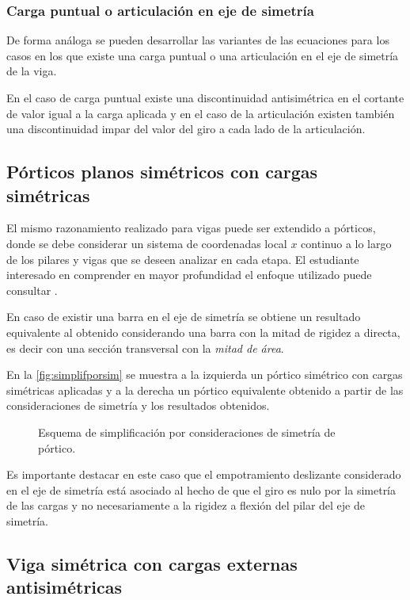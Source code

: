\subsubsection{Carga puntual o articulación en eje de simetría}

De forma análoga se pueden desarrollar las variantes de las ecuaciones para los casos en los que existe una carga puntual o una articulación en el eje de simetría de la viga.

En el caso de carga puntual existe una discontinuidad antisimétrica en el cortante de valor igual a la carga aplicada y en el caso de la articulación existen también una discontinuidad impar del valor del giro a cada lado de la articulación. %
%


\subsection{Pórticos planos simétricos con cargas simétricas}

El mismo razonamiento realizado para vigas puede ser extendido a pórticos, donde se debe considerar un sistema de coordenadas local $x$ continuo a lo largo de los pilares y vigas que se deseen analizar en cada etapa. %
%
El estudiante interesado en comprender en mayor profundidad el enfoque utilizado puede consultar \citep{CerveraRuiz2002ii}. %

En caso de existir una barra en el eje de simetría se obtiene un resultado equivalente al obtenido considerando una barra con la mitad de rigidez a directa, es decir con una sección transversal con la \textit{mitad de área}. %
%



En la \autoref{fig:simplifporsim} se muestra a la izquierda un pórtico simétrico con cargas simétricas aplicadas y a la derecha un pórtico equivalente obtenido a partir de las consideraciones de simetría y los resultados obtenidos. %
%
\begin{figure}[htb]
\centering
\def\svgwidth{0.8\textwidth}

\caption{Esquema de simplificación por consideraciones de simetría de pórtico.}
\label{fig:simplifporsim}
\end{figure}

Es importante destacar en este caso que el empotramiento deslizante considerado en el eje de simetría está asociado al hecho de que el giro es nulo por la simetría de las cargas y no necesariamente a la rigidez a flexión del pilar del eje de simetría.


\subsection{Viga simétrica con cargas externas antisimétricas}

